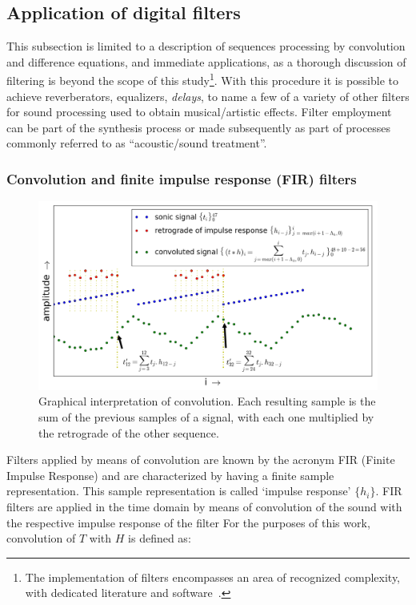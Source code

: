 \subsection{Application of digital filters}\label{subsec:filtros}
This subsection is limited to a description of sequences processing by convolution and difference equations, and immediate applications, as a thorough discussion of filtering is beyond the scope of this study\footnote{The implementation of filters encompasses an area of recognized complexity, with dedicated literature and software~\cite{Openheim,smith}.}.
With this procedure it is possible to achieve reverberators, equalizers, \emph{delays}, to name a few of a variety of other filters for sound processing used to obtain musical/artistic effects.
Filter employment can be part of the synthesis process or made subsequently as part of processes commonly referred to as ``acoustic/sound treatment''.


\subsubsection{Convolution and finite impulse response (FIR) filters}\label{subsec:conv}
\begin{figure}
     \centering
         \includegraphics[width=\textwidth]{figures/convolucao_}
     \caption{Graphical interpretation of convolution. Each resulting sample is the sum of the previous samples of a signal, with each one multiplied by the retrograde of the other sequence.}
         \label{fig:conv}
\end{figure}

Filters applied by means of convolution are known by the acronym FIR (Finite Impulse Response) and are characterized by having a finite sample representation.
This sample representation is called `impulse response' $\{h_i\}$.
FIR filters are applied in the time domain by means of convolution of the sound with the respective impulse response of the filter
For the purposes of this work, convolution of $T$ with $H$ is defined as:

